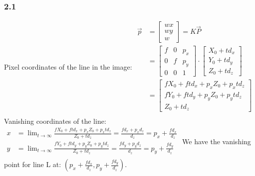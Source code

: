\documentclass{article}
\begin{document}
\subsubsection*{2.1}
Pixel coordinates of the line in the image:\newline
$
\begin{aligned}
    \vec{p} &= 
    \begin{bmatrix}
        wx\\
        wy\\
        w
    \end{bmatrix}
    = K\vec{P}\\
    &=
    \begin{bmatrix}
        f & 0 & p_x\\
        0 & f & p_y\\
        0 & 0 & 1
    \end{bmatrix}
    \cdot
    \begin{bmatrix}
        X_0 + td_x\\
        Y_0 + td_y\\
        Z_0 + td_z
    \end{bmatrix}\\
    &=
    \begin{bmatrix}
        fX_0 + ftd_x + p_x Z_0 + p_x td_z\\
        fY_0 + ftd_y + p_y Z_0 + p_y td_z\\
        Z_0 + td_z
    \end{bmatrix}\\
\end{aligned}
$\newline\newline
Vanishing coordinates of the line:\newline
$
\begin{aligned}
    x &= \lim_{t \rightarrow \infty} 
        \frac{fX_0 + ftd_x + p_x Z_0 + p_x td_z}{Z_0 + td_z}
        = \frac{fd_x + p_x d_z}{d_z} = p_x + \frac{fd_x}{d_z}\\
    y &= \lim_{t \rightarrow \infty} 
        \frac{fY_0 + ftd_y + p_y Z_0 + p_y td_z}{Z_0 + td_z}
        = \frac{fd_y + p_y d_z}{d_z} = p_y + \frac{fd_y}{d_z}\\
\end{aligned}
$\newline\newline
We have the vanishing point for line L at: \newline
$(p_x + \frac{fd_x}{d_z}, p_y + \frac{fd_y}{d_z})$.
\end{document}
